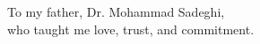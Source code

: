 
\begin{dedication}
	\raggedleft
To my father, Dr. Mohammad Sadeghi, \\
who taught me love, trust, and commitment.
\end{dedication}
